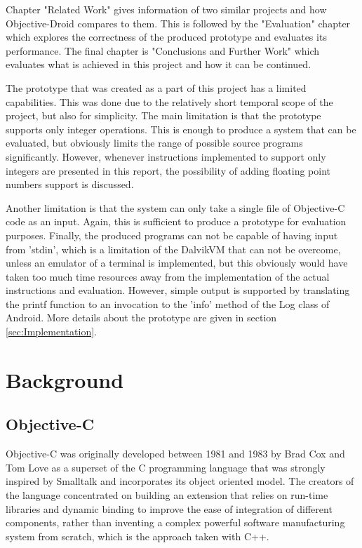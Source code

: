 \documentclass[parskip]{cs4rep}
\begin{document}
Chapter "Related Work" gives information of two similar projects and how Objective-Droid compares to them. This is followed by the "Evaluation" chapter which explores the correctness of the produced prototype and evaluates its performance. The final chapter is "Conclusions and Further Work" which evaluates what is achieved in this project and how it can be continued.

The prototype that was created as a part of this project has a limited capabilities. This was done due to the relatively short temporal scope of the project, but also for simplicity. The main limitation is that the prototype supports only integer operations. This is enough to produce a system that can be evaluated, but obviously limits the range of possible source programs significantly. However, whenever instructions implemented to support only integers are presented in this report, the possibility of adding floating point numbers support is discussed.

Another limitation is that the system can only take a single file of Objective-C code as an input. Again, this is sufficient to produce a prototype for evaluation purposes. Finally, the produced programs can not be capable of having input from 'stdin', which is a limitation of the DalvikVM that can not be overcome, unless an emulator of a terminal is implemented, but this obviously would have taken too much time resources away from the implementation of the actual instructions and evaluation. However, simple output is supported by translating the printf function to an invocation to the 'info' method of the Log class of Android. More details about the prototype are given in section \ref{sec:Implementation}.

\chapter{Background}

\section{Objective-C}

Objective-C was originally developed between 1981 and 1983 by Brad Cox and Tom Love as a superset of the C programming language that was strongly inspired by Smalltalk and incorporates its object oriented model\cite{Biancuzzi2009}. The creators of the language concentrated on building an extension that relies on run-time libraries and dynamic binding to improve the ease of integration of different components, rather than inventing a complex powerful software manufacturing system from scratch, which is the approach taken with C++.
\end{document}
